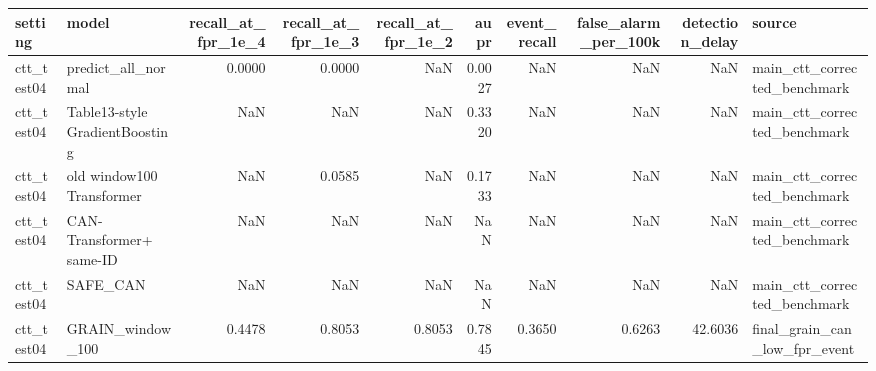 \begin{tabular}{llrrrrrrrl}
\toprule
setting & model & recall_at_fpr_1e_4 & recall_at_fpr_1e_3 & recall_at_fpr_1e_2 & aupr & event_recall & false_alarm_per_100k & detection_delay & source \\
\midrule
ctt_test04 & predict_all_normal & 0.0000 & 0.0000 & NaN & 0.0027 & NaN & NaN & NaN & main_ctt_corrected_benchmark \\
ctt_test04 & Table13-style GradientBoosting & NaN & NaN & NaN & 0.3320 & NaN & NaN & NaN & main_ctt_corrected_benchmark \\
ctt_test04 & old window100 Transformer & NaN & 0.0585 & NaN & 0.1733 & NaN & NaN & NaN & main_ctt_corrected_benchmark \\
ctt_test04 & CAN-Transformer+ same-ID & NaN & NaN & NaN & NaN & NaN & NaN & NaN & main_ctt_corrected_benchmark \\
ctt_test04 & SAFE_CAN & NaN & NaN & NaN & NaN & NaN & NaN & NaN & main_ctt_corrected_benchmark \\
ctt_test04 & GRAIN_window_100 & 0.4478 & 0.8053 & 0.8053 & 0.7845 & 0.3650 & 0.6263 & 42.6036 & final_grain_can_low_fpr_event \\
\bottomrule
\end{tabular}
